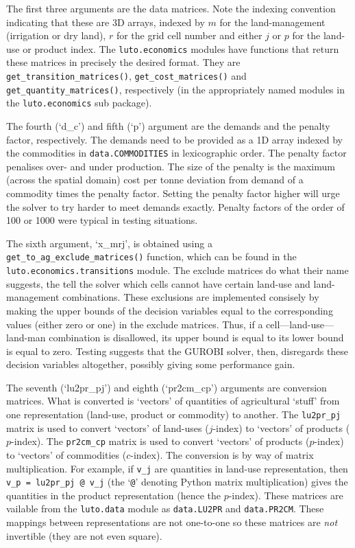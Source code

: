 \documentclass[12pt,a4paper,twoside]{article}
\begin{document}
The first three arguments are the data matrices. Note the indexing convention indicating that these are 3D arrays, indexed by $m$ for the land-management (irrigation or dry land), $r$ for the grid cell number and either $j$ or $p$ for the land-use or product index. The \texttt{luto.economics} modules have functions that return these matrices in precisely the desired format. They are \texttt{get_transition_matrices()}, \texttt{get_cost_matrices()} and \texttt{get_quantity_matrices()}, respectively (in the appropriately named modules in the \texttt{luto.economics} sub package).

The fourth (`d_c') and fifth (`p') argument are the demands and the penalty factor, respectively. The demands need to be provided as a 1D array indexed by the commodities in \texttt{data.COMMODITIES} in lexicographic order. The penalty factor penalises over- and under production. The size of the penalty is the maximum (across the spatial domain) cost per tonne deviation from demand of a commodity times the penalty factor. Setting the penalty factor higher will urge the solver to try harder to meet demands exactly. Penalty factors of the order of 100 or 1000 were typical in testing situations.

The sixth argument, `x_mrj', is obtained using a \texttt{get_to_ag_exclude_matrices()} function, which can be found in the \texttt{luto.economics.transitions} module. The exclude matrices do what their name suggests, the tell the solver which cells cannot have certain land-use and land-management combinations. These exclusions are implemented consisely by making the upper bounds of the decision variables equal to the corresponding values (either zero or one) in the exclude matrices. Thus, if a cell---land-use---land-man combination is disallowed, its upper bound is equal to its lower bound is equal to zero. Testing suggests that the GUROBI solver, then, disregards these decision variables altogether, possibly giving some performance gain.

The seventh (`lu2pr_pj') and eighth (`pr2cm_cp') arguments are conversion matrices. What is converted is `vectors' of quantities of agricultural `stuff' from one representation (land-use, product or commodity) to another. The \texttt{lu2pr_pj} matrix is used to convert `vectors' of land-uses ($j$-index) to `vectors' of products ($p$-index). The \texttt{pr2cm_cp} matrix is used to convert `vectors' of products ($p$-index) to `vectors' of commodities ($c$-index). The conversion is by way of matrix multiplication. For example, if \texttt{v_j} are quantities in land-use representation, then \texttt{v_p = lu2pr_pj @ v_j} (the `\texttt{@}' denoting Python matrix multiplication) gives the quantities in the product representation (hence the $p$-index). These matrices are vailable from the \texttt{luto.data} module as \texttt{data.LU2PR} and \texttt{data.PR2CM}. These mappings between representations are not one-to-one so these matrices are \emph{not} invertible (they are not even square).
\end{document}
